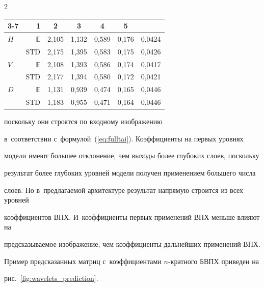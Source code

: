 \begin{multicols}{2}
\begin{center}
{\begin{tabular}{ |l r|c|c|c|c|c| }
\cline{3-7}


 \multicolumn{2}{|c|}{БВПХ}  & 1 & 2 & 3 & 4 & 5 \\ 


 \hline


$H$ & $\mathbb{E}$ & 2,105 & 1,132 & 0,589 & 0,176 & 0,0424 \\


 & STD & 2,175 & 1,395 & 0,583 & 0,175 & 0,0426 \\ 


 \hline


 $V$ & $\mathbb{E}$ & 2,108 & 1,393 & 0,586 & 0,174 & 0,0417 \\


 & STD & 2,177 & 1,394 & 0,580 & 0,172 & 0,0421 \\ 


 \hline


$D$ & $\mathbb{E}$ & 1,131 & 0,939 & 0,474 & 0,165 & 0,0446 \\


 & STD & 1,183 & 0,955 & 0,471 & 0,164 & 0,0446 \\ 


 \hline


\end{tabular}


}


\end{center}







\noindent


 поскольку они строятся по входному изображению 


в~соответствии с~формулой~(\ref{eq:fulltai}). Коэффициенты на первых уровнях 


модели имеют большее отклонение, чем выходы более глубоких слоев, поскольку 


результат более глубоких уровней модели получен применением большего числа 


слоев. Но в~предлагаемой архитектуре результат напрямую строится из всех уровней 


коэффициентов ВПХ. И~коэффициенты первых применений ВПХ меньше влияют на 


предсказываемое изображение, чем коэффициенты дальнейших применений ВПХ.











Пример предсказанных матриц с~коэффициентами $n$-крат\-но\-го БВПХ приведен на 


рис.~\ref{fig:wavelets_prediction}.





\pagebreak





\end{multicols}
